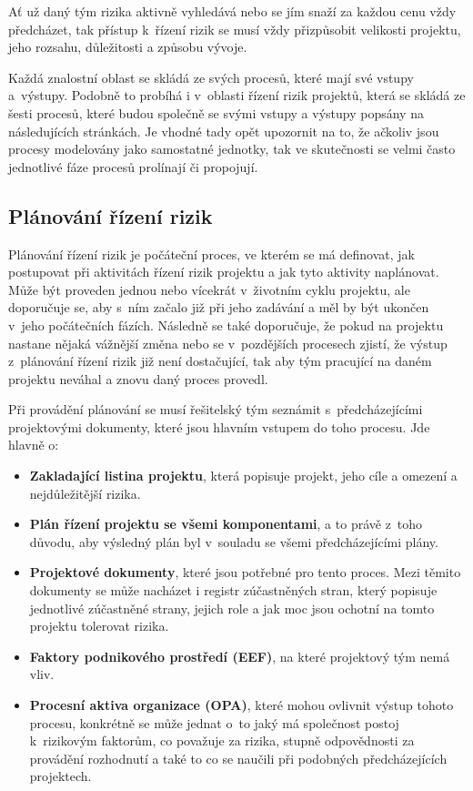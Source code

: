 Ať už daný tým rizika aktivně vyhledává nebo se jím snaží za každou cenu vždy předcházet, tak přístup k~řízení rizik se musí vždy přizpůsobit velikosti projektu, jeho rozsahu, důležitosti a způsobu vývoje.

Každá znalostní oblast se skládá ze svých procesů, které mají své vstupy a~výstupy. Podobně to probíhá i v~oblasti řízení rizik projektů, která se skládá ze šesti procesů, které budou společně se svými vstupy a výstupy popsány na následujících stránkách. Je vhodné tady opět upozornit na to, že ačkoliv jsou procesy modelovány jako samostatné jednotky, tak ve skutečnosti se velmi často jednotlivé fáze procesů prolínají či propojují.

\subsection{Plánování řízení rizik}

Plánování řízení rizik je počáteční proces, ve kterém se má definovat, jak postupovat při aktivitách řízení rizik projektu a jak tyto aktivity naplánovat. Může být proveden jednou nebo vícekrát v~životním cyklu projektu, ale doporučuje se, aby s~ním začalo již při jeho zadávání a měl by být ukončen v~jeho počátečních fázích. Následně se také doporučuje, že pokud na projektu nastane nějaká vážnější změna nebo se v~pozdějších procesech zjistí, že výstup z~plánování řízení rizik již není dostačující, tak aby tým pracující na daném projektu neváhal a znovu daný proces provedl. 

Při provádění plánování se musí řešitelský tým seznámit s~předcházejícími projektovými dokumenty, které jsou hlavním vstupem do toho procesu. Jde hlavně o: 

\begin{itemize}
    \item \textbf{Zakladající listina projektu}, která popisuje projekt, jeho cíle a omezení a nejdůležitější rizika. 
    \item \textbf{Plán řízení projektu se všemi komponentami}, a to právě z~toho důvodu, aby výsledný plán byl v~souladu se všemi předcházejícími plány.
    \item \textbf{Projektové dokumenty}, které jsou potřebné pro tento proces. Mezi těmito dokumenty se může nacházet i registr zúčastněných stran, který popisuje jednotlivé zúčastněné strany, jejich role a jak moc jsou ochotní na tomto projektu tolerovat rizika. 
    \item \textbf{Faktory podnikového prostředí (EEF)}, na které projektový tým nemá vliv.
    \item \textbf{Procesní aktiva organizace (OPA)}, které mohou ovlivnit výstup tohoto procesu, konkrétně se může jednat o~to jaký má společnost postoj k~rizikovým faktorům, co považuje za rizika, stupně odpovědnosti za provádění rozhodnutí a také to co se naučili při podobných předcházejících projektech.
\end{itemize}

